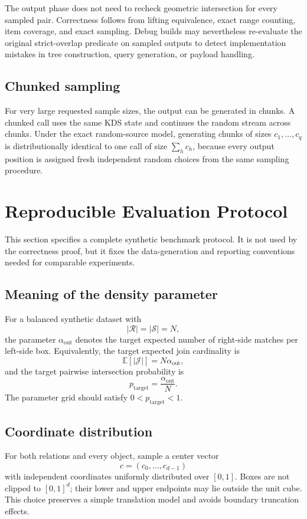 \documentclass[11pt]{article}
\theoremstyle{definition}
\theoremstyle{plain}
\theoremstyle{remark}
\newcommand{\Rrel}{\mathcal R}
\newcommand{\Srel}{\mathcal S}
\newcommand{\Jset}{\mathcal J}
\begin{document}
The output phase does not need to recheck geometric intersection for every sampled pair.
Correctness follows from lifting equivalence, exact range counting, item coverage, and exact
sampling.  Debug builds may nevertheless re-evaluate the original strict-overlap predicate
on sampled outputs to detect implementation mistakes in tree construction, query generation,
or payload handling.

\subsection{Chunked sampling}

For very large requested sample sizes, the output can be generated in chunks.  A chunked call
uses the same KDS state and continues the random stream across chunks.  Under the exact
random-source model, generating chunks of sizes $c_1,\ldots,c_q$ is distributionally identical
to one call of size $\sum_h c_h$, because every output position is assigned fresh independent
random choices from the same sampling procedure.

\section{Reproducible Evaluation Protocol}

This section specifies a complete synthetic benchmark protocol.  It is not used by the
correctness proof, but it fixes the data-generation and reporting conventions needed for
comparable experiments.

\subsection{Meaning of the density parameter}

For a balanced synthetic dataset with
\[
  |\Rrel|=|\Srel|=N,
\]
the parameter $\alpha_{\mathrm{out}}$ denotes the target expected number of right-side matches
per left-side box.  Equivalently, the target expected join cardinality is
\[
  \mathbb E[|\Jset|]=N\alpha_{\mathrm{out}},
\]
and the target pairwise intersection probability is
\[
  p_{\mathrm{target}}=\frac{\alpha_{\mathrm{out}}}{N}.
\]
The parameter grid should satisfy $0<p_{\mathrm{target}}<1$.

\subsection{Coordinate distribution}

For both relations and every object, sample a center vector
\[
  c=(c_0,\ldots,c_{d-1})
\]
with independent coordinates uniformly distributed over $[0,1]$.  Boxes are not clipped to
$[0,1]^d$; their lower and upper endpoints may lie outside the unit cube.  This choice
preserves a simple translation model and avoids boundary truncation effects.
\end{document}

